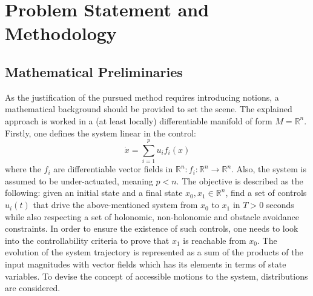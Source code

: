 \documentclass[letterpaper, 10 pt, conference]{ieeeconf}
\begin{document}
\section{\textbf{Problem Statement and Methodology}}

\subsection{Mathematical Preliminaries}

As the justification of the pursued method requires introducing notions, a mathematical background should be provided to set the scene. The explained approach is worked in a (at least locally) differentiable manifold of form $M = \mathbb{R}^n$. Firstly, one defines the system linear in the control:
\begin{equation}
    \dot x = \sum\limits_{i=1}^{p} u_i f_i(x)
\end{equation}
where the $f_i$ are differentiable vector fields in $\mathbb{R}^n: f_i : \mathbb{R}^n \rightarrow \mathbb{R}^n$. Also, the system is assumed to be under-actuated, meaning $p < n$. The objective is described as the following: given an initial state and a final state $x_0, x_1 \in \mathbb{R}^n$, find a set of controls $u_i(t)$ that drive the above-mentioned system from $x_0$ to $x_1$ in $T > 0$ seconds while also respecting a set of holonomic, non-holonomic and obstacle avoidance constraints. In order to ensure the existence of such controls, one needs to look into the controllability criteria to prove that $x_1$ is reachable from $x_0$. The evolution of the system trajectory is represented as a sum of the products of the input magnitudes with vector fields which has its elements in terms of state variables. To devise the concept of accessible motions to the system, distributions are considered.
\\
\end{document}
